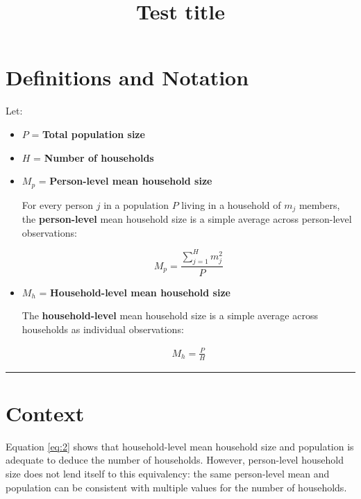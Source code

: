 \documentclass[
]{article}
\title{Test title}
\author{}
\date{\vspace{-2.5em}}
\begin{document}
\maketitle

\hypertarget{definitions-and-notation}{%
\section{Definitions and Notation}\label{definitions-and-notation}}

Let:

\begin{itemize}
\item
  \(P\) = \textbf{Total population size}
\item
  \(H\) = \textbf{Number of households}
\item
  \(M_p\) = \textbf{Person-level mean household size}

  For every person \(j\) in a population \(P\) living in a household of
  \(m_j\) members, the \textbf{person-level} mean household size is a
  simple average across person-level observations:

  \begin{equation}
    \label{eq:1}
    \tag{1}
    M_p = \frac{\sum_{j = 1}^H m_j^2}{P}
    \end{equation}
\item
  \(M_h\) = \textbf{Household-level mean household size}

  The \textbf{household-level} mean household size is a simple average
  across households as individual observations:

  \begin{align}
    \label{eq:2}
    \tag{2}
    M_h = \frac{P}{H}
    \end{align}
\end{itemize}

\begin{center}\rule{0.5\linewidth}{0.5pt}\end{center}

\hypertarget{context}{%
\section{Context}\label{context}}

Equation \eqref{eq:2} shows that household-level mean household size and
population is adequate to deduce the number of households. However,
person-level household size does not lend itself to this equivalency:
the same person-level mean and population can be consistent with
multiple values for the number of households.
\end{document}
